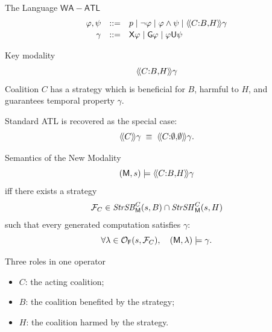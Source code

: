 \documentclass[aspectratio=169,10pt]{beamer}
\newcommand{\WATL}{\ensuremath{\mathsf{WA{-}ATL}}\xspace}
\newcommand{\SB}{\mathit{StrSB}}
\newcommand{\SH}{\mathit{StrSH}}
\begin{document}
\begin{frame}{The Language \WATL}
  \[
  \begin{array}{rcl}
    \varphi,\psi &::=& p \mid \neg\varphi \mid \varphi\wedge\psi
      \mid \langle\!\langle C{:}B{,}H  \rangle\!\rangle\gamma \\[0.2em]
    \gamma &::=& \mathsf{X}\varphi \mid \mathsf{G}\varphi \mid \varphi\mathsf{U}\psi
  \end{array}
  \]

  \vspace{0.6em}
  \begin{block}{Key modality}
    \[
      \langle\!\langle C{:}B{,}H  \rangle\!\rangle\gamma
    \]
    Coalition $C$ has a strategy which is beneficial for $B$, harmful to $H$, and guarantees temporal property $\gamma$.
  \end{block}

  \vspace{0.5em}
  Standard ATL is recovered as the special case:
  \[
    \langle\!\langle C \rangle\!\rangle\gamma \;\equiv\; \langle\!\langle C{:}\emptyset{,}\emptyset  \rangle\!\rangle\gamma.
  \]
\end{frame}

\begin{frame}{Semantics of the New Modality}
  \[
  (\mathsf{M},s)\models \langle\!\langle C{:}B{,}H  \rangle\!\rangle\gamma
  \]
  iff there exists a strategy
  \[
    \js_C \in \SB^C_\M(s,B)\cap \SH^C_\M(s,H)
  \]
  such that every generated computation satisfies $\gamma$:
  \[
    \forall \lambda\in\mathcal{O}_{\mathsf{F}}(s,\mathcal{F}_C),\quad
    (\mathsf{M},\lambda)\models \gamma.
  \]

  \vspace{0.8em}
  \begin{block}{Three roles in one operator}
    \begin{itemize}
      \item $C$: the acting coalition;
      \item $B$: the coalition benefited by the strategy;
      \item $H$: the coalition harmed by the strategy.
    \end{itemize}
  \end{block}
\end{frame}
\end{document}
